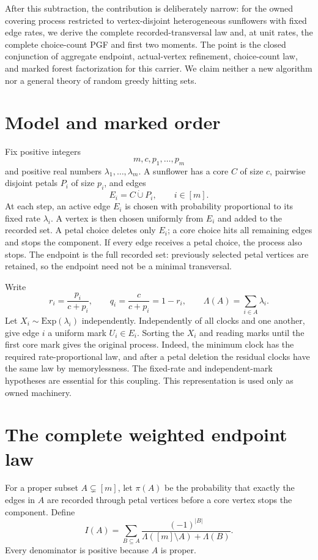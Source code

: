 \documentclass[10pt,a4paper]{amsart}
\newcommand{\Lam}{\Lambda}
\begin{document}
After this subtraction, the contribution is deliberately narrow: for the
owned covering process restricted to vertex-disjoint heterogeneous sunflowers
with fixed edge rates, we derive the complete recorded-transversal law and, at
unit rates, the complete choice-count PGF and first two moments.  The point is the
closed conjunction of aggregate endpoint, actual-vertex refinement,
choice-count law, and marked forest factorization for this carrier.  We claim neither a new
algorithm nor a general theory of random greedy hitting sets.

\section{Model and marked order}

Fix positive integers
\[
  m,c,p_1,\ldots,p_m
\]
and positive real numbers $\lambda_1,\ldots,\lambda_m$.  A sunflower has a
core $C$ of size $c$, pairwise disjoint petals $P_i$ of size $p_i$, and edges
\[
  E_i=C\mathbin{\dot\cup}P_i,\qquad i\in[m].
\]
At each step, an active edge $E_i$ is chosen with probability proportional to
its fixed rate $\lambda_i$.  A vertex is then chosen uniformly from $E_i$ and
added to the recorded set.  A petal choice deletes only $E_i$; a core choice
hits all remaining edges and stops the component.  If every edge receives a
petal choice, the process also stops.  The endpoint is the full recorded set:
previously selected petal vertices are retained, so the endpoint need not be a
minimal transversal.

Write
\[
 r_i=\frac{p_i}{c+p_i},\qquad
 q_i=\frac{c}{c+p_i}=1-r_i,
 \qquad
 \Lam(A)=\sum_{i\in A}\lambda_i.
\]
Let $X_i\sim\mathrm{Exp}(\lambda_i)$ independently.  Independently of all
clocks and one another, give edge $i$ a uniform mark $U_i\in E_i$.  Sorting
the $X_i$ and reading marks until the first core mark gives the original
process.  Indeed, the minimum clock has the required rate-proportional law,
and after a petal deletion the residual clocks have the same law by
memorylessness.  The fixed-rate and independent-mark hypotheses are essential
for this coupling.  This representation is used only as owned machinery.

\section{The complete weighted endpoint law}

For a proper subset $A\subsetneq[m]$, let $\pi(A)$ be the probability that
exactly the edges in $A$ are recorded through petal vertices before a core
vertex stops the component.  Define
\begin{equation}\label{eq:integral-sum}
 I(A)=\sum_{B\subseteq A}
       \frac{(-1)^{|B|}}{\Lam([m]\setminus A)+\Lam(B)}.
\end{equation}
Every denominator is positive because $A$ is proper.
\end{document}
